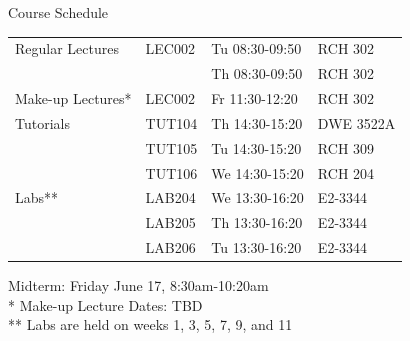 \documentclass[aspectratio=169]{beamer}
\begin{document}
	\begin{frame}{Course Schedule}
		\begin{center}
			\begin{tabular}{l l l l}
				Regular Lectures & LEC002 & Tu 08:30-09:50 & RCH 302 	\\
								 & 		  & Th 08:30-09:50 & RCH 302 	\\
				\hline
				Make-up Lectures*& LEC002 & Fr 11:30-12:20 & RCH 302 	\\
				\hline			
				Tutorials 		 & TUT104 & Th 14:30-15:20 & DWE 3522A 	\\
						  		 & TUT105 & Tu 14:30-15:20 & RCH 309   	\\
						  		 & TUT106 & We 14:30-15:20 & RCH 204   	\\
				\hline			
				Labs** 	  		 & LAB204 & We 13:30-16:20 & E2-3344	\\
								 & LAB205 & Th 13:30-16:20 & E2-3344	\\
								 & LAB206 & Tu 13:30-16:20 & E2-3344	\\
				\hline
			\end{tabular}
		\end{center}		
		Midterm: Friday June 17, 8:30am-10:20am				\\
		*    Make-up Lecture Dates: TBD						\\
		**   Labs are held on weeks 1, 3, 5, 7, 9, and 11 	\\
	\end{frame}
	
	
	
\end{document}
